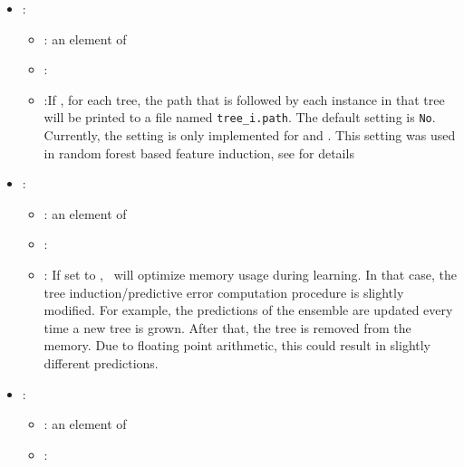 \begin{itemize}
\begin{itemize}
           \end{itemize}
    \item {}:
           \begin{itemize}
                \item \optionPossibleValues{}: an element of 
                \item \optionDefaultValue{}: 
                \item \optionDescrption{}:If , for each tree, the path that is followed by each instance in that tree will be printed to a file named {\tt tree\_i.path}.  The default setting is \texttt{No}. Currently, the setting is only implemented for  and . This setting was used in random forest based feature induction, see \cite{Vens2011} for details
           \end{itemize}
    \item {}:
           \begin{itemize}
                \item \optionPossibleValues{}: an element of 
                \item \optionDefaultValue{}: 
                \item \optionDescrption{}: If set to , \clus\ will optimize memory usage during learning. In that case, the tree induction/predictive error computation procedure is slightly modified.
                For example, the predictions of the ensemble are updated every time a new tree is grown.
                After that, the tree is removed from the memory. Due to floating point arithmetic, this could result in slightly different predictions.
           \end{itemize}
    \item {}:
           \begin{itemize}
                \item \optionPossibleValues{}: an element of 
                \item \optionDefaultValue{}: 

\end{itemize}
\end{itemize}

